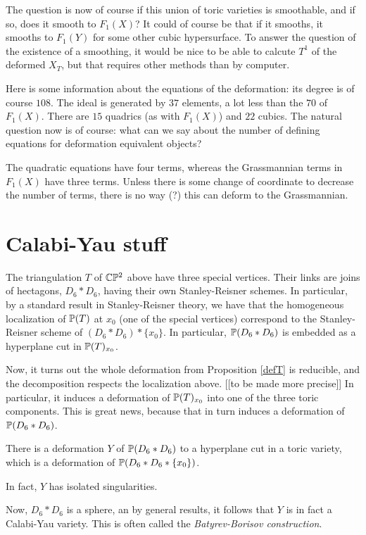 \documentclass[11pt, english]{article}
\begin{document}
The question is now of course if this union of toric varieties is smoothable, and if so, does it smooth to $F_1(X)$? It could of course be that if it smooths, it smooths to $F_1(Y)$ for some other cubic hypersurface. To answer the question of the existence of a smoothing, it would be nice to be able to calcute $T^1$ of the deformed $X_T$, but that requires other methods than by computer. 

Here is some information about the equations of the deformation: its degree is of course $108$. The ideal is generated by $37$ elements, a lot less than the $70$ of $F_1(X)$. There are $15$ quadrics (as with $F_1(X)$) and $22$ cubics. The natural question now is of course: what can we say about the number of defining equations for deformation equivalent objects?

\begin{remark}
 The quadratic equations have four terms, whereas the Grassmannian terms in $F_1(X)$ have three terms. Unless there is some change of coordinate to decrease the number of terms, there is no way (?) this can deform to the Grassmannian.
\end{remark}

\section{Calabi-Yau stuff}

The triangulation $T$ of $\mathbb{C} \mathbb{P}^2$ above  have three special vertices. Their links are joins of hectagons, $D_6 \ast D_6$, having their own Stanley-Reisner schemes. In particular, by a standard result in Stanley-Reisner theory, we have that the homogeneous localization of $\mathbb{P}(T)$ at $x_0$ (one of the special vertices) correspond to the Stanley-Reisner scheme of $(D_6 \ast D_6) \ast \{ x_0 \}$. In particular, $\mathbb{P}(D_6 \ast D_6)$ is embedded as a hyperplane cut in $\mathbb{P}(T)_{x_0}$. 

Now, it turns out the whole deformation from Proposition \ref{defT} is reducible, and the decomposition respects the localization above. [[to be made more precise]] In particular, it induces a deformation of $\mathbb{P}(T)_{x_0}$ into one of the three toric components. This is great news, because that in turn induces a deformation of $\mathbb{P}(D_6 \ast D_6)$.

\begin{lemma}
There is a deformation $Y$ of $\mathbb{P}(D_6 \ast D_6)$ to a hyperplane cut in a toric variety, which is a deformation of $\mathbb{P}(D_6 \ast D_6 \ast \{x_0 \})$.

In fact, $Y$ has isolated singularities.  
\end{lemma}

Now, $D_6 \ast D_6$ is a sphere, an by general results, it follows that $Y$ is in fact a Calabi-Yau variety. This is often called the \emph{Batyrev-Borisov construction}.


 
\end{document}
